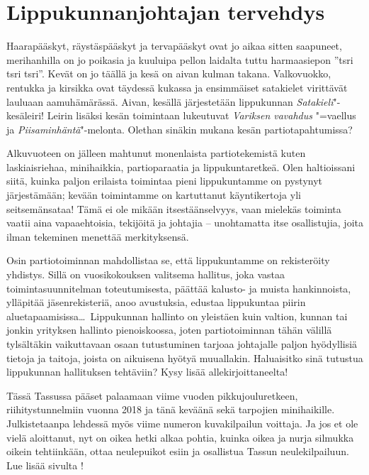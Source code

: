 \section{Lippukunnanjohtajan tervehdys}

\begin{multicols}{2}
\noindent Haarapääskyt, räystäspääskyt ja tervapääskyt ovat jo aikaa sitten saapuneet, merihanhilla on jo poikasia ja kuuluipa pellon laidalta tuttu harmaasiepon ''tsri tsri tsri''. Kevät on jo täällä ja kesä on aivan kulman takana. Valkovuokko, rentukka ja kirsikka ovat täydessä kukassa ja ensimmäiset satakielet virittävät lauluaan aamuhämärässä. Aivan, kesällä järjestetään lippukunnan \textit{Satakieli}"-kesäleiri! Leirin lisäksi kesän toimintaan lukeutuvat \textit{Variksen vavahdus} "=vaellus ja \textit{Piisaminhäntä}"-melonta. Olethan sinäkin mukana kesän partiotapahtumissa?

Alkuvuoteen on jälleen mahtunut monenlaista partiotekemistä kuten laskiaisriehaa, minihaikkia, partioparaatia ja lippukuntaretkeä. Olen haltioissani siitä, kuinka paljon erilaista toimintaa pieni lippukuntamme on pystynyt järjestämään; kevään toimintamme on kartuttanut käyntikertoja yli seitsemänsataa! Tämä ei ole mikään itsestäänselvyys, vaan mielekäs toiminta vaatii aina vapaaehtoisia, tekijöitä ja johtajia -- unohtamatta itse osallistujia, joita ilman tekeminen menettää merkityksensä.  

Osin partiotoiminnan mahdollistaa se, että lippukuntamme on rekisteröity yhdistys. Sillä on vuosikokouksen valitsema hallitus, joka vastaa toimintasuunnitelman toteutumisesta, päättää kalusto- ja muista hankinnoista, ylläpitää jäsenrekisteriä, anoo avustuksia, edustaa lippukuntaa piirin aluetapaamisissa\ldots\ Lippukunnan hallinto on yleistäen kuin valtion, kunnan tai jonkin yrityksen hallinto pienoiskoossa, joten partiotoiminnan tähän välillä tylsältäkin vaikuttavaan osaan tutustuminen tarjoaa johtajalle paljon hyödyllisiä tietoja ja taitoja, joista on aikuisena hyötyä muuallakin. Haluaisitko sinä tutustua lippukunnan hallituksen tehtäviin? Kysy lisää allekirjoittaneelta!

Tässä Tassussa pääset palaamaan viime vuoden pikkujouluretkeen, riihitystunnelmiin vuonna 2018 ja tänä keväänä sekä tarpojien minihaikille. Julkistetaanpa lehdessä myös viime numeron kuvakilpailun voittaja. Ja jos et ole vielä aloittanut, nyt on oikea hetki alkaa pohtia, kuinka oikea ja nurja silmukka oikein tehtiinkään, ottaa neulepuikot esiin ja osallistua Tassun neulekilpailuun. Lue lisää sivulta \pageref{sec:neulekilpailu}!


\end{multicols}
